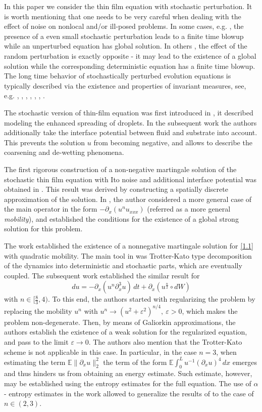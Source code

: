 \documentclass[a4paper,12pt]{article}
\numberwithin{equation}{section}
\newcommand{\ve}{{\varepsilon}}
\def\ve{\varepsilon}
\def\d{\partial}
\def\E{\mathbb{E}}
\begin{document}
In this paper we consider the thin film equation with stochastic perturbation. It is worth mentioning that one needs to be very careful when dealing with the effect of noise on nonlocal and/or ill-posed problems. In some cases, e.g. \cite{MisStaTop}, the presence of a even small stochastic perturbation leads to a finite time blowup while an unperturbed equation has global solution. In others \cite{Sta}, the effect of the random perturbation is exactly opposite - it may lead to the existence of a global solution while the corresponding deterministic equation has a finite time blowup. The long time behavior of stochastically perturbed evolution equations is typically described via the existence and properties of invariant measures, see, e.g. \cite{MisStaYip1}, \cite{MisStaYip2}, \cite{MisStaYip3}, \cite{MisStaSta}, \cite{MisStaHie}, \cite{MisStaKap}, \cite{MisStaCla}.

The stochastic version of thin-film equation was first introduced in \cite{DavMorSlo}, it described  modeling the enhanced spreading of droplets.  In the subsequent work \cite{GruMeRa} the authors additionally take the interface potential between fluid and substrate into account. This prevents the solution $u$ from becoming negative, and allows to describe the coarsening and de-wetting phenomena. 

The first rigorous construction of a non-negative martingale solution of the stochastic thin film equation with Ito noise and additional interface potential was obtained in \cite{FisGru}. This result was derived by constructing a spatially discrete approximation of the solution.  In \cite{Cor}, the author considered a more general case of the main operator in the form $-\partial_x(u^{n}u_{xxx})$ (referred as a more general {\it{mobility}}), and established the conditions for the existence of a global strong solution for this problem. 

The work \cite{Gess1}  established the existence of a nonnegative martingale solution for \eqref{1.1} with quadratic mobility.  The main tool in \cite{Gess1} was Trotter-Kato type decomposition of the dynamics into deterministic and stochastic parts, which are eventually coupled. The subsequent work \cite{Gess2} established the similar result for
\[
du  = - \partial_x(u^n \partial_x^3 u)\, dt + \partial _x (u^{\frac{n}{2}} \circ  dW)
\]
with $n \in [\frac{8}{3}, 4)$.  To this end, the authors started with regularizing the problem by replacing the mobility $u^n$ with $u^n \to (u^2+\ve^2)^{n/4}, \ \ve>0$, which makes the problem non-degenerate. Then, by means of Galiorkin approximations, the authors  establish the existence of a weak solution for the regularized equation, and  pass to the limit $\ve \to 0$.  The authors also mention that the Trotter-Kato scheme is not applicable in this case. In particular, in the case $n = 3$, when estimating the term $\E \|\d_x u\|_2^2$ the term of the form $\E \int_0^L u^{-1} (\d_x u)^4 \, dx$ emerges and thus hinders us from obtaining an energy estimate. Such estimate, however, may be established using the entropy estimates for the full equation. The use of $\alpha$ - entropy estimates in the work \cite{Sauer} allowed to generalize the results of \cite{Gess2} to the case of $n \in (2,3)$.
\end{document}
